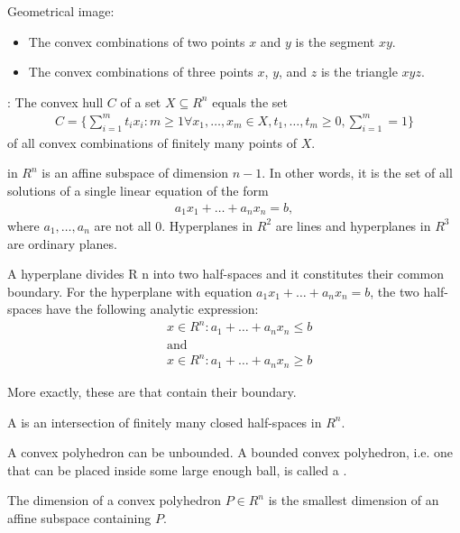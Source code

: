     \par Geometrical image:
    \begin{itemize}
      \item The convex combinations of two points $x$ and $y$ is the segment $xy$.
      \item The convex combinations of three points $x$, $y$, and $z$ is the triangle $xyz$.
    \end{itemize}

    \par {}: The convex hull $C$ of a set $X \subseteq R^n$ equals the set
      \begin{align*}
        C = \bigg\{
          \sum\limits_{i = 1}^m t_i x_i: m \geq 1 \forall x_1, \ldots, x_m \in X, t_1, \ldots, t_m \geq 0, \sum\limits_{i = 1}^m = 1
        \bigg\}
      \end{align*}
      of all convex combinations of finitely many points of $X$.

    \par {} in $R^n$ is an affine subspace of dimension $n - 1$. In other words, it is the set of all solutions of a single linear equation of the form
    \begin{align*}
      a_1 x_1 + \ldots + a_n x_n = b,
    \end{align*}
    where $a_1, \ldots, a_n$ are not all 0. Hyperplanes in $R^2$ are lines and hyperplanes in $R^3$ are ordinary planes.
    \par A hyperplane divides R n into two half-spaces and it constitutes their common boundary. For the hyperplane with equation $a_1 x_1 + \ldots + a_n x_n = b$, the two half-spaces have the following analytic expression:
    \begin{align*}
      &x \in R^n: a_1 + \ldots + a_n x_n \leq b \\
      &\text{and} \\
      &x \in R^n: a_1 + \ldots + a_n x_n \geq b
    \end{align*}
    \par More exactly, these are  that contain their boundary.
    \par A  is an intersection of finitely many closed half-spaces in $R^n$.
    \par A convex polyhedron can be unbounded. A bounded convex polyhedron, i.e. one that can be placed inside some large enough ball, is called a .
    \par The dimension of a convex polyhedron $P \in R^n$ is the smallest dimension of an affine subspace containing $P$.

